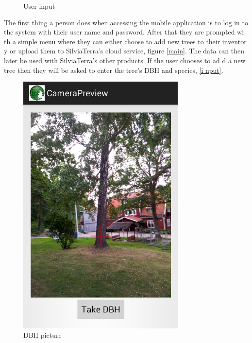 \begin{figure}[!htb]
	  	\caption{User input}
  		\label{input}
	\endminipage\hfill
\end{figure}
The first thing a person does when accessing the mobile application is to log in
to the system with their user name and password. After that they are prompted wi
th a simple menu where they can either choose to add new trees to their inventor
y or upload them to SilviaTerra's cloud service, figure \ref{main}. The data can
 then later be used with SilviaTerra's other products. If the user chooses to ad
d a new tree then they will be asked to enter the tree's DBH and species, \ref{i
nput}. 
\begin{figure}[!htb]
		\centering
  		\includegraphics[width=0.75\textwidth]{dbh.png}
	  	\caption{DBH picture}
	  	\label{dbh}
	\endminipage\hfill
		\centering

\end{figure}
